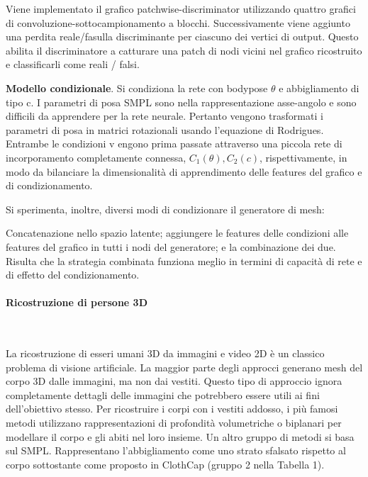 \medskip

Viene implementato il grafico patchwise-discriminator utilizzando quattro grafici di convoluzione-sottocampionamento a
blocchi. Successivamente viene aggiunto una perdita reale/fasulla discriminante per ciascuno dei vertici di output.  Questo abilita il discriminatore
a catturare una patch di nodi vicini nel grafico ricostruito e classificarli come reali / falsi.

\medskip

\textbf{Modello condizionale}. Si condiziona la rete con bodypose $\theta$ e abbigliamento di tipo c. I parametri di posa SMPL sono
nella rappresentazione asse-angolo e sono difficili da apprendere per la rete neurale.
Pertanto vengono trasformati i parametri di posa in matrici rotazionali usando l'equazione di Rodrigues.
Entrambe le condizioni v engono prima passate attraverso una piccola rete di incorporamento completamente connessa, $C_{1}(\theta), C_{2}(c)$, rispettivamente, in modo da bilanciare la dimensionalità di apprendimento delle features del grafico e di condizionamento.

\medskip

Si sperimenta, inoltre, diversi modi di condizionare il generatore di mesh: 

Concatenazione nello spazio latente; aggiungere le features delle condizioni alle features del grafico in tutti i nodi del generatore; e la combinazione dei due. Risulta che la strategia combinata funziona meglio in termini di capacità di rete e di effetto del condizionamento.


\paragraph{Ricostruzione di persone 3D}~

La ricostruzione di esseri umani 3D da immagini e video 2D è un classico problema di visione artificiale.
La maggior parte degli approcci generano mesh del corpo 3D dalle immagini, ma non dai vestiti.
Questo tipo di approccio ignora completamente dettagli delle immagini che potrebbero essere utili ai fini dell’obiettivo stesso.
Per ricostruire i corpi con i vestiti addosso, i più famosi metodi utilizzano rappresentazioni di profondità volumetriche  o biplanari per modellare il corpo e gli abiti nel loro insieme.
Un altro gruppo di metodi si basa sul SMPL.
Rappresentano l'abbigliamento come uno strato sfalsato rispetto al corpo sottostante come proposto in ClothCap (gruppo 2 nella Tabella 1).

